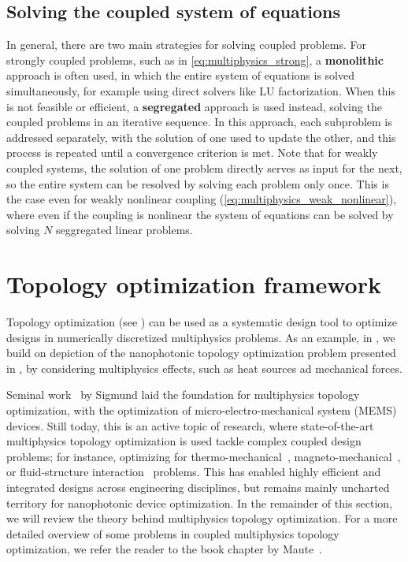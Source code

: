     \subsection*{Solving the coupled system of equations}

    In general, there are two main strategies for solving coupled problems. For strongly coupled problems, 
    such as in \eqref{eq:multiphysics_strong}, a \textbf{monolithic} approach is often used, in which the entire system of 
    equations is solved simultaneously, for example using direct solvers like LU factorization. When this is not feasible or 
    efficient, a \textbf{segregated} approach is used instead, solving the coupled problems in an iterative sequence. In this 
    approach, each subproblem is addressed separately, with the solution of one used to update the other, and this process 
    is repeated until a convergence criterion is met. Note that for weakly coupled systems, the solution of one problem directly 
    serves as input for the next, so the entire system can be resolved by solving each problem only once. This is the case even for 
    weakly nonlinear coupling (\eqref{eq:multiphysics_weak_nonlinear}), where even if the coupling is nonlinear the system of equations
    can be solved by solving $N$ seggregated linear problems.
    
    \section{Topology optimization framework}\label{sec:topopt_theory}
    Topology optimization (see ) can be used as a systematic design tool to optimize designs in numerically discretized multiphysics problems. 
    As an example, in , we build on depiction of the nanophotonic topology optimization problem presented in , by considering
    multiphysics effects, such as heat sources ad mechanical forces.

    Seminal work~\cite{MEMS_multi} by Sigmund laid the foundation for multiphysics topology optimization, with the optimization of micro-electro-mechanical system (MEMS) devices. 
    Still today, this is an active topic of research, where state-of-the-art multiphysics topology optimization is used tackle complex coupled  design problems; for instance, optimizing for thermo-mechanical~\cite{third_thermal}, magneto-mechanical~\cite{magneto}, or fluid-structure interaction~\cite{fsint} problems. 
    This has enabled highly efficient and integrated designs across engineering disciplines, but remains mainly uncharted territory for nanophotonic device optimization. In the remainder of this section, we will review the theory behind multiphysics topology optimization. For a more detailed overview of some problems in coupled multiphysics
    topology optimization, we refer the reader to the book chapter by Maute~\cite{coupled_topopt}.


